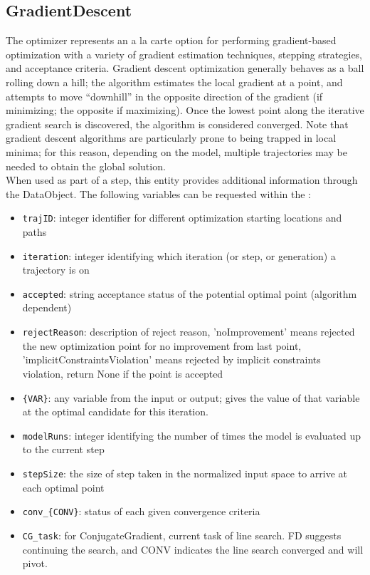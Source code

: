 \subsection{GradientDescent}
  The  optimizer represents an a la carte option
  for performing gradient-based optimization with a variety of gradient
  estimation techniques, stepping strategies, and acceptance criteria. \hspace{12pt}
  Gradient descent optimization generally behaves as a ball rolling down a hill;
  the algorithm estimates the local gradient at a point, and attempts to move
  ``downhill'' in the opposite direction of the gradient (if minimizing; the
  opposite if maximizing). Once the lowest point along the iterative gradient search
  is discovered, the algorithm is considered converged. \hspace{12pt}
  Note that gradient descent algorithms are particularly prone to being trapped
  in local minima; for this reason, depending on the model, multiple trajectories
  may be needed to obtain the global solution.
\vspace{7pt} \\When used as part of a  step, this entity provides
        additional information through the  DataObject. The
        following variables can be requested within the :
        \begin{itemize}
          \item \texttt{trajID}: integer identifier for different optimization starting locations and paths
             \item \texttt{iteration}: integer identifying which iteration (or step, or generation) a trajectory is on
             \item \texttt{accepted}: string acceptance status of the potential optimal point (algorithm dependent)
             \item \texttt{rejectReason}: description of reject reason, 'noImprovement' means rejected the new optimization point for no improvement from last point, 'implicitConstraintsViolation' means rejected by implicit constraints violation, return None if the point is accepted
             \item \texttt{\{VAR\}}: any variable from the  input or output; gives the value of that variable at the optimal candidate for this iteration.
             \item \texttt{modelRuns}: integer identifying the number of times the model is evaluated up to the current step
             \item \texttt{stepSize}: the size of step taken in the normalized input space to arrive at each optimal point
             \item \texttt{conv\_\{CONV\}}: status of each given convergence criteria
             \item \texttt{CG\_task}: for ConjugateGradient, current task of line search. FD suggests continuing the search, and CONV indicates the line search converged and will pivot.

         \end{itemize}


